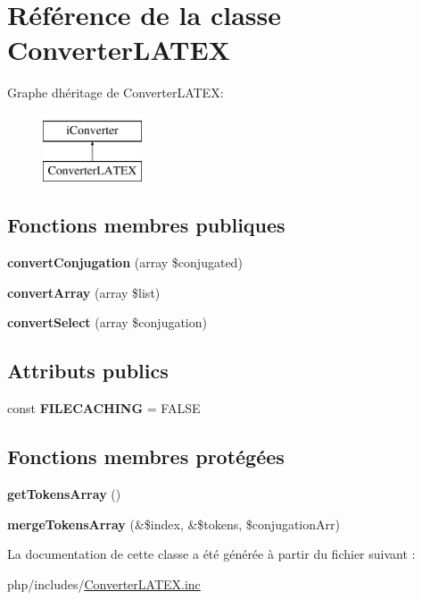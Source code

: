 \hypertarget{classConverterLATEX}{}\section{Référence de la classe Converter\+L\+A\+T\+EX}
\label{classConverterLATEX}
Graphe d\textquotesingle{}héritage de Converter\+L\+A\+T\+EX\+:\begin{figure}[H]
\begin{center}
\leavevmode
\includegraphics[height=2.000000cm]{classConverterLATEX}
\end{center}
\end{figure}
\subsection*{Fonctions membres publiques}
\begin{DoxyCompactItemize}
\item 
\hypertarget{classConverterLATEX_ada7781cb4daaf2f4a2f0c69e1d2f24e6}{}\label{classConverterLATEX_ada7781cb4daaf2f4a2f0c69e1d2f24e6} 
{\bfseries convert\+Conjugation} (array \$conjugated)
\item 
\hypertarget{classConverterLATEX_a1a30f6b145b4cb051d9dbbf8f9e8978f}{}\label{classConverterLATEX_a1a30f6b145b4cb051d9dbbf8f9e8978f} 
{\bfseries convert\+Array} (array \$list)
\item 
\hypertarget{classConverterLATEX_a21a5d5c23b40c7bb3b5cd7ebdbee3cae}{}\label{classConverterLATEX_a21a5d5c23b40c7bb3b5cd7ebdbee3cae} 
{\bfseries convert\+Select} (array \$conjugation)
\end{DoxyCompactItemize}
\subsection*{Attributs publics}
\begin{DoxyCompactItemize}
\item 
\hypertarget{classConverterLATEX_adaea9c0bff492f67f17ebe245ee889b1}{}\label{classConverterLATEX_adaea9c0bff492f67f17ebe245ee889b1} 
const {\bfseries F\+I\+L\+E\+C\+A\+C\+H\+I\+NG} = F\+A\+L\+SE
\end{DoxyCompactItemize}
\subsection*{Fonctions membres protégées}
\begin{DoxyCompactItemize}
\item 
\hypertarget{classConverterLATEX_a99d0b931aa33c2e4282c28f03b248e85}{}\label{classConverterLATEX_a99d0b931aa33c2e4282c28f03b248e85} 
{\bfseries get\+Tokens\+Array} ()
\item 
\hypertarget{classConverterLATEX_a5c2a6e5f6478af9a846f3b607c8d9105}{}\label{classConverterLATEX_a5c2a6e5f6478af9a846f3b607c8d9105} 
{\bfseries merge\+Tokens\+Array} (\&\$index, \&\$tokens, \$conjugation\+Arr)
\end{DoxyCompactItemize}


La documentation de cette classe a été générée à partir du fichier suivant \+:\begin{DoxyCompactItemize}
\item 
php/includes/\hyperlink{ConverterLATEX_8inc}{Converter\+L\+A\+T\+E\+X.\+inc}\end{DoxyCompactItemize}
